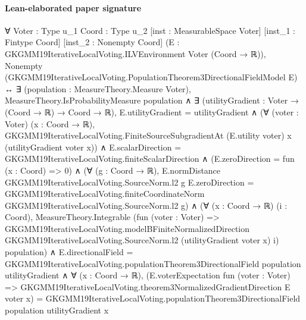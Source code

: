\documentclass[10pt]{article}
\begin{document}
\paragraph{Lean-elaborated paper signature}
\begin{ReviewVerbatim}
∀ {Voter : Type u_1} {Coord : Type u_2} [inst : MeasurableSpace Voter] [inst_1 : Fintype Coord]
  [inst_2 : Nonempty Coord] (E : GKGMM19IterativeLocalVoting.ILVEnvironment Voter (Coord → ℝ)),
  Nonempty (GKGMM19IterativeLocalVoting.PopulationTheorem3DirectionalFieldModel E) ↔
    ∃ (population : MeasureTheory.Measure Voter),
      MeasureTheory.IsProbabilityMeasure population ∧
        ∃ (utilityGradient : Voter → (Coord → ℝ) → Coord → ℝ),
          E.utilityGradient = utilityGradient ∧
            (∀ (voter : Voter) (x : Coord → ℝ),
                GKGMM19IterativeLocalVoting.FiniteSourceSubgradientAt (E.utility voter) x (utilityGradient voter x)) ∧
              E.scalarDirection = GKGMM19IterativeLocalVoting.finiteScalarDirection ∧
                (E.zeroDirection = fun (x : Coord) => 0) ∧
                  (∀ (g : Coord → ℝ),
                      E.normDistance GKGMM19IterativeLocalVoting.SourceNorm.l2 g E.zeroDirection =
                        GKGMM19IterativeLocalVoting.finiteCoordinateNorm GKGMM19IterativeLocalVoting.SourceNorm.l2 g) ∧
                    (∀ (x : Coord → ℝ) (i : Coord),
                        MeasureTheory.Integrable
                          (fun (voter : Voter) =>
                            GKGMM19IterativeLocalVoting.modelBFiniteNormalizedDirection
                              GKGMM19IterativeLocalVoting.SourceNorm.l2 (utilityGradient voter x) i)
                          population) ∧
                      E.directionalField =
                          GKGMM19IterativeLocalVoting.populationTheorem3DirectionalField population utilityGradient ∧
                        ∀ (x : Coord → ℝ),
                          (E.voterExpectation fun (voter : Voter) =>
                              GKGMM19IterativeLocalVoting.theorem3NormalizedGradientDirection E voter x) =
                            GKGMM19IterativeLocalVoting.populationTheorem3DirectionalField population utilityGradient x
\end{ReviewVerbatim}
\end{document}
